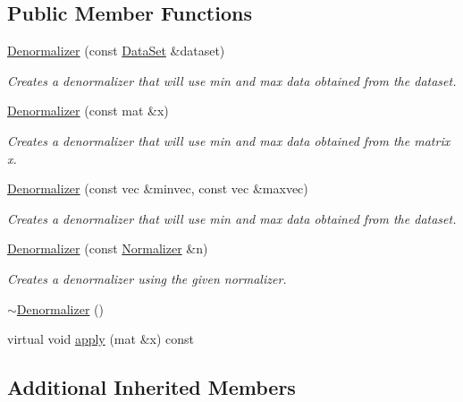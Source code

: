 \subsection*{Public Member Functions}
\begin{DoxyCompactItemize}
\item 
\hyperlink{classhappyml_1_1Denormalizer_a3afa7cfb90125b5ff82bc8b7265287fc}{Denormalizer} (const \hyperlink{classhappyml_1_1DataSet}{Data\+Set} \&dataset)
\begin{DoxyCompactList}\small\item\em Creates a denormalizer that will use min and max data obtained from the dataset. \end{DoxyCompactList}\item 
\hyperlink{classhappyml_1_1Denormalizer_afdb1825e2e4c813db0555ca70c3d745a}{Denormalizer} (const mat \&x)
\begin{DoxyCompactList}\small\item\em Creates a denormalizer that will use min and max data obtained from the matrix x. \end{DoxyCompactList}\item 
\hyperlink{classhappyml_1_1Denormalizer_ad0cfa938971d2ddeccdf7c2723feb698}{Denormalizer} (const vec \&minvec, const vec \&maxvec)
\begin{DoxyCompactList}\small\item\em Creates a denormalizer that will use min and max data obtained from the dataset. \end{DoxyCompactList}\item 
\hyperlink{classhappyml_1_1Denormalizer_a6b8296bc74b7c90b8237a596da893d2d}{Denormalizer} (const \hyperlink{classhappyml_1_1Normalizer}{Normalizer} \&n)
\begin{DoxyCompactList}\small\item\em Creates a denormalizer using the given normalizer. \end{DoxyCompactList}\item 
\hyperlink{classhappyml_1_1Denormalizer_ad0fa1ca5cf1296d1a383ad617cfe82b5}{$\sim$\+Denormalizer} ()
\item 
virtual void \hyperlink{classhappyml_1_1Denormalizer_a2f1aa35006d0573f07fc33e8f154c170}{apply} (mat \&x) const 
\end{DoxyCompactItemize}
\subsection*{Additional Inherited Members}


